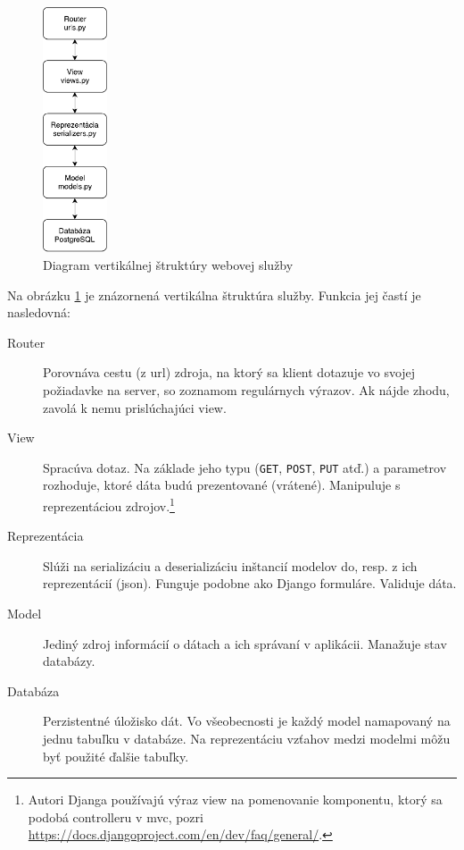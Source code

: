 \begin{figure}
  \centering
  \includegraphics[width=0.17\textwidth]{figures/ws-vertical.pdf}
  \caption{\label{fig:ws_vertical} Diagram vertikálnej štruktúry webovej služby}
\end{figure}

Na obrázku \ref{fig:ws_vertical} je znázornená vertikálna štruktúra služby.
Funkcia jej častí je nasledovná:

\begin{description}
\item[Router] Porovnáva cestu (z \acrshort{url}) zdroja, na ktorý sa klient
  dotazuje vo svojej požiadavke na server, so zoznamom regulárnych výrazov. Ak
  nájde zhodu, zavolá k nemu prislúchajúci view.
\item[View] Spracúva dotaz. Na základe jeho typu (\texttt{GET}, \texttt{POST},
  \texttt{PUT} atď.) a parametrov rozhoduje, ktoré dáta budú prezentované
  (vrátené). Manipuluje s reprezentáciou zdrojov.\footnote{Autori Djanga
    používajú výraz view na pomenovanie komponentu, ktorý sa podobá controlleru
    v \acrshort{mvc}, pozri
    \url{https://docs.djangoproject.com/en/dev/faq/general/}.}
\item[Reprezentácia] Slúži na serializáciu a deserializáciu inštancií modelov
  do, resp. z ich reprezentácií (\acrshort{json}). Funguje podobne ako Django
  formuláre. Validuje dáta.
\item[Model] Jediný zdroj informácií o dátach a ich správaní v aplikácii.
  Manažuje stav databázy.
\item[Databáza] Perzistentné úložisko dát. Vo všeobecnosti je každý model
  namapovaný na jednu tabuľku v databáze. Na reprezentáciu vzťahov medzi modelmi
  môžu byť použité ďalšie tabuľky.
\end{description}

